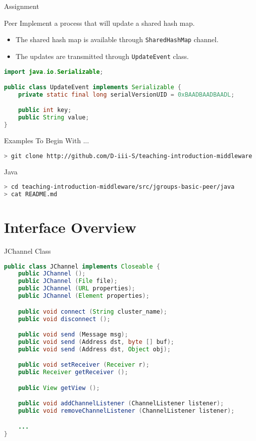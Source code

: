 \begin{frame}[fragile]{Assignment}
    \begin{block}{Peer}
        Implement a process that will update a shared hash map.
        \begin{itemize}
            \item The shared hash map is available through \lstinline{SharedHashMap} channel.
            \item The updates are transmitted through \lstinline{UpdateEvent} class.
        \end{itemize}
    \end{block}

\begin{lstlisting}[language=java,style=mini]
import java.io.Serializable;

public class UpdateEvent implements Serializable {
    private static final long serialVersionUID = 0xBAADBAADBAADL;

    public int key;
    public String value;
}
\end{lstlisting}
\end{frame}


\begin{frame}[fragile]{Examples To Begin With ...}
\begin{lstlisting}[language=bash,style=mini]
> git clone http://github.com/D-iii-S/teaching-introduction-middleware.git
\end{lstlisting}
    \begin{block}{Java}
\begin{lstlisting}[language=bash,style=mini]
> cd teaching-introduction-middleware/src/jgroups-basic-peer/java
> cat README.md
\end{lstlisting}
    \end{block}
\end{frame}


\section{Interface Overview}


\begin{frame}[fragile]{JChannel Class}
\begin{lstlisting}[language=java,style=mini]
public class JChannel implements Closeable {
    public JChannel ();
    public JChannel (File file);
    public JChannel (URL properties);
    public JChannel (Element properties);

    public void connect (String cluster_name);
    public void disconnect ();

    public void send (Message msg);
    public void send (Address dst, byte [] buf);
    public void send (Address dst, Object obj);

    public void setReceiver (Receiver r);
    public Receiver getReceiver ();

    public View getView ();

    public void addChannelListener (ChannelListener listener);
    public void removeChannelListener (ChannelListener listener);

    ...
}
\end{lstlisting}
\end{frame}


